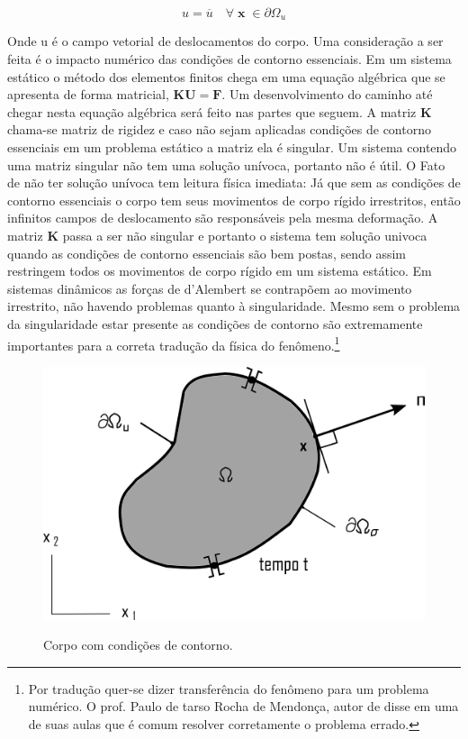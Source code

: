 \begin{equation}
	u = \overline{u} \quad \forall \; \boldsymbol{x} \; \in  \partial \Omega_u
\end{equation}

Onde \gls{u} é o campo vetorial de deslocamentos do corpo. Uma consideração a ser feita é o impacto numérico das condições de contorno essenciais. Em um sistema estático o método dos elementos finitos chega em uma equação algébrica que se apresenta de forma matricial, $ \boldsymbol{K} \boldsymbol{U} = \boldsymbol{F} $. Um desenvolvimento do caminho até chegar nesta equação algébrica será feito nas partes que seguem. A matriz $ \boldsymbol{K} $ chama-se matriz de rigidez e caso não sejam aplicadas condições de contorno essenciais em um problema estático a matriz ela é singular. Um sistema contendo uma matriz singular não tem uma solução unívoca, portanto não é útil. O Fato de não ter solução unívoca tem leitura física imediata: Já que sem as condições de contorno essenciais o corpo tem seus movimentos de corpo rígido irrestritos, então infinitos campos de deslocamento são responsáveis pela mesma deformação. A matriz $\boldsymbol{K} $ passa a ser não singular e portanto o sistema tem solução univoca quando as condições de contorno essenciais são bem postas, sendo assim restringem todos os movimentos de corpo rígido em um sistema estático. Em sistemas dinâmicos as forças de d'Alembert se contrapõem ao movimento irrestrito, não havendo problemas quanto à singularidade. Mesmo sem o problema da singularidade estar presente as condições de contorno são extremamente importantes para a correta tradução da física do fenômeno.\footnote{Por tradução quer-se dizer transferência do fenômeno para um problema numérico. O prof. Paulo de tarso Rocha de Mendonça, autor de \cite{Paulo} disse em uma de suas aulas que é comum resolver corretamente o problema errado. } \\

\begin{figure}
	\caption{Corpo com condições de contorno.}
	\includegraphics{images/CorpoCondCont.png}
	\label{fig:condcont}
\end{figure}

